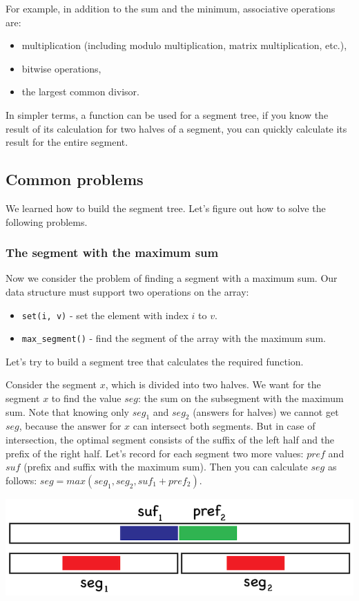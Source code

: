\documentclass[11pt]{article}
\begin{document}
For example, in addition to the sum and the minimum, associative operations are:
\begin{itemize}
\item multiplication (including modulo multiplication, matrix multiplication, etc.),
\item bitwise operations,
\item the largest common divisor.
\end{itemize}

In simpler terms, a function can be used for a segment tree, if you know the result of its
calculation for two halves of a segment, you can quickly calculate its result for the entire
segment.

\subsection{Common problems}
\label{sec:org97fc2be}
We learned how to build the segment tree. Let's figure out how to solve the following problems.

\subsubsection{The segment with the maximum sum}
\label{sec:orgbcaac67}
Now we consider the problem of finding a segment with a maximum sum. Our data structure must
support two operations on the array:
\begin{itemize}
\item \texttt{set(i, v)} - set the element with index \(i\) to \(v\).
\item \texttt{max\_segment()} - find the segment of the array with the maximum sum.
\end{itemize}

Let's try to build a segment tree that calculates the required function.

Consider the segment \(x\), which is divided into two halves. We want for the segment \(x\) to find
the value \(seg\): the sum on the subsegment with the maximum sum. Note that knowing only \(seg_1\)
and \(seg_2\) (answers for halves) we cannot get \(seg\), because the answer for \(x\) can intersect
both segments. But in case of intersection, the optimal segment consists of the suffix of the
left half and the prefix of the right half. Let's record for each segment two more values:
\(pref\) and \(suf\) (prefix and suffix with the maximum sum). Then you can calculate \(seg\) as
follows: \(seg = max(seg_1, seg_2, suf_1 + pref_2)\).
\begin{center}
\includegraphics[width=.9\linewidth]{./images/segment-tree-7.png}
\end{center}
\end{document}
